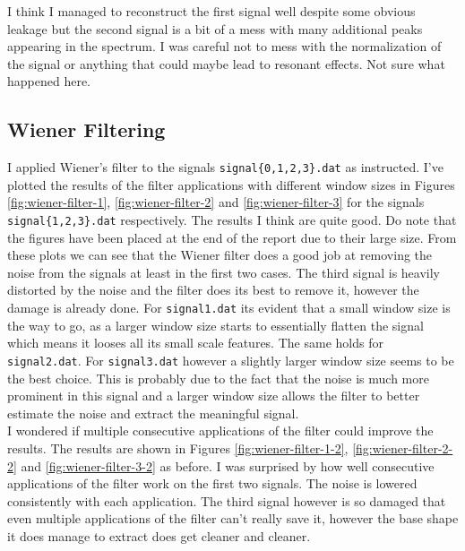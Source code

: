 \documentclass[10pt, titlepage, a4paper]{article}
\begin{document}
I think I managed to reconstruct the first signal well despite some obvious leakage but the second signal is a bit of a mess 
with many additional peaks appearing in the spectrum. I was careful not to mess with the normalization of the signal or anything
that could maybe lead to resonant effects. Not sure what happened here. \\

\subsection{Wiener Filtering}
I applied Wiener's filter to the signals \texttt{signal\{0,1,2,3\}.dat} as instructed. I've plotted the results of the filter 
applications with different window sizes in Figures \ref{fig:wiener-filter-1}, \ref{fig:wiener-filter-2} and 
\ref{fig:wiener-filter-3} for the signals \texttt{signal\{1,2,3\}.dat} respectively. The results I think are quite good. Do note 
that the figures have been placed at the end of the report due to their large size.
From these plots we can see that the Wiener filter does a good job at removing the noise from the signals at least in the first two 
cases. The third signal is heavily distorted by the noise and the filter does its best to remove it, however the damage 
is already done. For \texttt{signal1.dat} its evident that a small window size is the way to go, as a larger window size 
starts to essentially flatten the signal which means it looses all its small scale features. The same holds for \texttt{signal2.dat}.
For \texttt{signal3.dat} however a slightly larger window size seems to be the best choice. This is probably due to the fact that
the noise is much more prominent in this signal and a larger window size allows the filter to better estimate the noise and 
extract the meaningful signal. \\

I wondered if multiple consecutive applications of the filter could improve the results. The results are shown in Figures
\ref{fig:wiener-filter-1-2}, \ref{fig:wiener-filter-2-2} and \ref{fig:wiener-filter-3-2} as before. I was surprised by 
how well consecutive applications of the filter work on the first two signals. The noise is lowered consistently with 
each application. The third signal however is so damaged that even multiple applications of the filter can't really 
save it, however the base shape it does manage to extract does get cleaner and cleaner. \\
\end{document}
